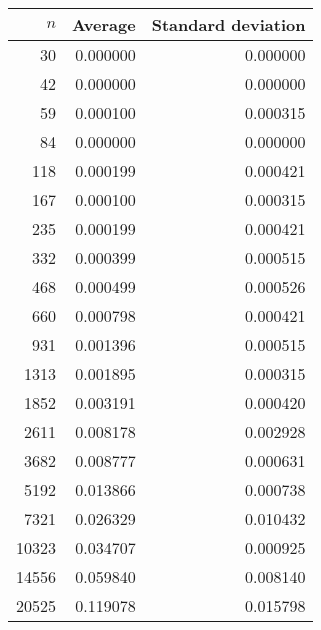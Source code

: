 \begin {tabular}{rrr}
$n$ & Average & Standard deviation\\ \hline 
30 & 0.000000 & 0.000000\\ 
42 & 0.000000 & 0.000000\\ 
59 & 0.000100 & 0.000315\\ 
84 & 0.000000 & 0.000000\\ 
118 & 0.000199 & 0.000421\\ 
167 & 0.000100 & 0.000315\\ 
235 & 0.000199 & 0.000421\\ 
332 & 0.000399 & 0.000515\\ 
468 & 0.000499 & 0.000526\\ 
660 & 0.000798 & 0.000421\\ 
931 & 0.001396 & 0.000515\\ 
1313 & 0.001895 & 0.000315\\ 
1852 & 0.003191 & 0.000420\\ 
2611 & 0.008178 & 0.002928\\ 
3682 & 0.008777 & 0.000631\\ 
5192 & 0.013866 & 0.000738\\ 
7321 & 0.026329 & 0.010432\\ 
10323 & 0.034707 & 0.000925\\ 
14556 & 0.059840 & 0.008140\\ 
20525 & 0.119078 & 0.015798\\ 
\end{tabular}
